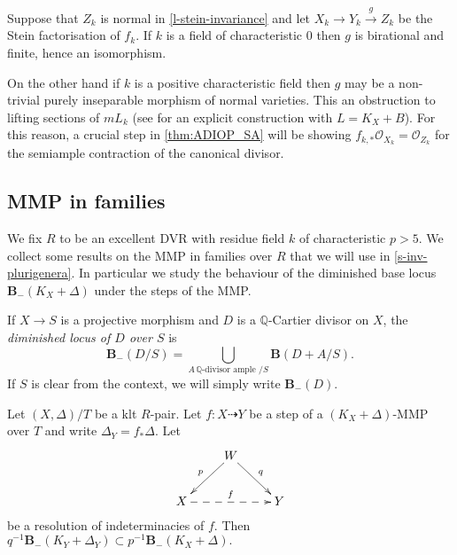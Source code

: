 	\begin{remark}\label{r-connected fibers v contraction}
	Suppose that $Z_{k}$ is normal in \autoref{l-stein-invariance} and let $X_{k}\to Y_{k} \xrightarrow{g} Z_{k}$ be the Stein factorisation of $f_{k}$. If $k$ is a field of characteristic $0$ then $g$ is birational and finite, hence an isomorphism.
	
	On the other hand if $k$ is a positive characteristic field then $g$ may be a non-trivial purely inseparable morphism of normal varieties. This an obstruction to lifting sections of $mL_k$ (see \cite{Bri20} for an explicit construction with $L=K_X+B$). For this reason, a crucial step in \autoref{thm:ADIOP_SA} will be showing $f_{k,*} \mathcal{O}_{X_k}=\mathcal{O}_{Z_k}$ for the semiample contraction of the canonical divisor.
	\end{remark}
	
		
	\subsection{MMP in families}

	We fix $R$ to be an excellent DVR with residue field $k$ of characteristic $p>5$.
	We collect some results on the MMP in families over $R$ that we will use in \autoref{s-inv-plurigenera}. In particular we study the behaviour of the diminished base locus $\mathbf{B}_{-}(K_X+\Delta)$ under the steps of the MMP.
	
	\begin{definition}
	If $X \to S$ is a projective morphism and $D$ is a $\mathbb{Q}$-Cartier divisor on $X$, the \emph{diminished locus of $D$ over $S$}  is  $$\mathbf{B}_{-}(D/S) = \bigcup_{A \, \mathbb{Q}\text{-divisor} \text{ ample }/S} \mathbf{B}(D+A/S).$$
	If $S$ is clear from the context, we will simply write $\mathbf{B}_{-}(D)$.
	\end{definition}

	\begin{lemma}\label{l-stable-base-loci}
	Let $(X,\Delta)/T$ be a klt $R$-pair.
	Let $f\colon X \dashrightarrow Y$ be a step of a  $(K_X+\Delta)$-MMP over $T$ and write $\Delta_Y=f_*\Delta$.
	Let
	\begin{equation*}
	\xymatrix{
		& W \ar[dr]^q \ar[dl]_p & \\
		X \ar@{-->}[rr]^{f} & & Y}
	\end{equation*} 
	be a resolution of indeterminacies of $f$.
	Then $q^{-1}\mathbf{B}_{-}(K_Y+\Delta_Y) \subset p^{-1}\mathbf{B}_{-}(K_X+\Delta).$
\end{lemma}

